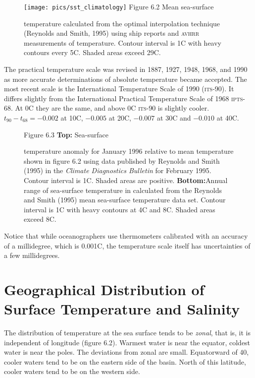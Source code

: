 \begin{figure}[t!]
\texttt{[image: pics/sst\_climatology]}
\footnotesize
Figure 6.2 Mean sea-surface \rule{0mm}{3ex}temperature calculated from
the optimal interpolation technique (Reynolds and Smith, 1995) using
ship reports and \textsc{avhrr} measurements of temperature. Contour
interval is 1\degrees C with heavy contours every 5\degrees C. Shaded
areas exceed 29\degrees C.
\label{fig:sst_climatology}
\vspace{-4ex}
\end{figure}

The practical temperature scale was revised in 1887, 1927, 1948, 1968,
and 1990 as more accurate determinations of absolute temperature
became accepted. The most recent scale is the International
Temperature Scale of 1990
(\textsc{its}-90). It differs slightly from the International Practical
Temperature Scale of 1968 \textsc{ipts}-68. At 0\degrees C they are
the same, and above 0\degrees C \textsc{its}-90 is slightly
cooler. $t_{90}-t_{68} = -0.002$ at 10\degrees C, $-0.005$ at
20\degrees C, $-0.007$ at 30\degrees C and $-0.010$ at 40\degrees C.

\begin{figure}[b!]
\vspace{-3ex}
\footnotesize
Figure 6.3 \textbf{Top:} Sea-surface \rule{0mm}{3ex}temperature
anomaly for January 1996 relative to mean temperature shown in figure
6.2 using data published by Reynolds and Smith (1995) in the
\textit{Climate Diagnostics Bulletin} for February 1995. Contour
interval is 1\degrees C. Shaded areas are
positive. \textbf{Bottom:}Annual range of sea-surface temperature in
 calculated from the Reynolds and Smith (1995) mean
sea-surface temperature data set. Contour interval is 1\degrees C with
heavy contours at 4\degrees C and 8\degrees C. Shaded areas exceed
8\degrees C.
\label{fig:SSTvariability}
\end{figure}

Notice that while oceanographers use thermometers calibrated with an
accuracy of a millidegree, which is
0.001\degrees C, the temperature scale itself has uncertainties of a
few millidegrees.

\section[Geographical Distribution]{Geographical Distribution of Surface
Temperature and Salinity} The distribution
of temperature at the sea surface tends to be \textit{zonal},
that is, it is independent of longitude (figure
6.2). Warmest water is near the equator, coldest water is near the
poles. The deviations from zonal are small. Equatorward of 40\degrees,
cooler waters tend to be on the eastern side of the basin. North of
this latitude, cooler waters tend to be on the western side.

